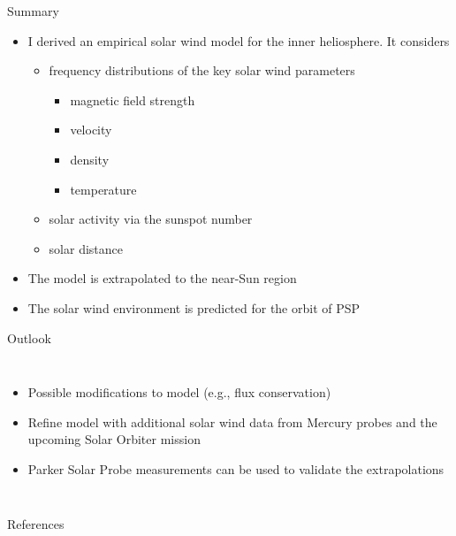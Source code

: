 \begin{frame}[c]{Summary}{}
	
	\begin{itemize}%
		\item I derived an empirical solar wind model for the inner heliosphere. It considers
		\begin{itemize}
			\item frequency distributions of the key solar wind parameters
			\begin{itemize}
				\item magnetic field strength
				\item velocity
				\item density
				\item temperature
			\end{itemize}
			\item solar activity via the sunspot number
			\item solar distance
		\end{itemize}
		\item The model is extrapolated to the near-Sun region
		\item The solar wind environment is predicted for the orbit of PSP
	\end{itemize}
	
\end{frame}
\begin{frame}[plain,c]{Outlook}{}
	\begin{columns}[c]
	\column{\textwidth}
		
		\begin{itemize}
			\item Possible modifications to model (e.g., flux conservation)
			\item Refine model with additional solar wind data from Mercury probes and the upcoming Solar Orbiter mission
			\item Parker Solar Probe measurements can be used to validate the extrapolations
		\end{itemize}
		
		\vspace{1cm}
		
		
	\end{columns}
\end{frame}

\begin{frame}[t,allowframebreaks]{References}
	\tiny
	\begin{thebibliography}{10}
	
		\beamertemplatebookbibitems
		
		\beamertemplatearticlebibitems
		
		

	\end{thebibliography}
\end{frame}


